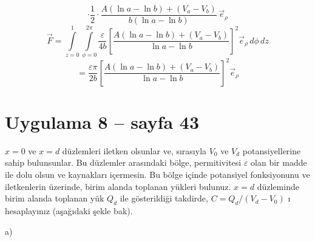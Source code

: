 \documentclass[11pt,a4paper]{article}
\begin{document}
\[ \cdot\frac12\cdot\frac{A(\ln a-\ln b)+(V_a-V_b)}{b(\ln a-\ln b)}\,\vec e_\rho \]
\[ \vec F=\int\limits_{z=0}^{1}\int\limits_{\phi=0}^{2\pi}\frac{\varepsilon}{4b}\left[\frac{A(\ln a-\ln b)+(V_a-V_b)}{\ln a-\ln b}\right]^{2}\vec e_\rho\,d\phi\,dz \]
\[ =\frac{\varepsilon\pi}{2b}\left[\frac{A(\ln a-\ln b)+(V_a-V_b)}{\ln a-\ln b}\right]^{2}\vec e_\rho \]

\section{Uygulama 8 -- sayfa 43}
\begin{ornek}[Pr.-2]
$x=0$ ve $x=d$ düzlemleri iletken olsunlar ve, sırasıyla $V_0$ ve $V_d$ potansiyellerine sahip bulunsunlar. Bu düzlemler arasındaki bölge, permitivitesi $\varepsilon$ olan bir madde ile dolu olsun ve kaynakları içermesin. Bu bölge içinde potansiyel fonksiyonunu ve iletkenlerin üzerinde, birim alanda toplanan yükleri bulunuz. $x=d$ düzleminde birim alanda toplanan yük $Q_d$ ile gösterildiği takdirde, $C=Q_d/(V_d-V_0)$ ı hesaplayınız (aşağıdaki şekle bak).
\end{ornek}

a)
\begin{center}
\end{center}
\end{document}
